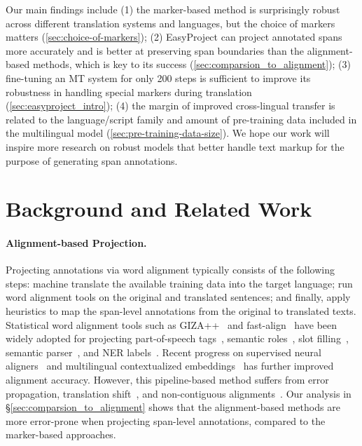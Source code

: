 \documentclass[11pt,dvipsnames]{article}
\begin{document}
Our main findings include (1) the marker-based method is surprisingly robust across different translation systems and languages, but the choice of markers matters (\ref{sec:choice-of-markers}); (2) EasyProject can project annotated spans more accurately and is better at preserving span boundaries than the  alignment-based methods, which is key to its success (\ref{sec:comparsion_to_alignment}); (3)  fine-tuning an MT system for only 200 steps is sufficient  to improve its robustness in handling special markers during translation (\ref{sec:easyproject_intro}); (4) the margin of improved cross-lingual transfer is related to the language/script family and amount of pre-training data included in the multilingual model (\ref{sec:pre-training-data-size}). 
We hope our work will inspire more research on robust models that better handle text markup for the purpose of generating span annotations.










\section{Background and Related Work}

\paragraph{Alignment-based Projection.}  Projecting annotations via word alignment typically consists of the following steps: machine translate the available training data into the target language; run word alignment tools on the original and translated sentences; and finally, apply heuristics to map the span-level annotations from the original to translated texts. 
Statistical word alignment tools such as  GIZA++~\citep{giza} and fast-align~\citep{dyer2013fast}  have been widely adopted for projecting part-of-speech tags~\citep{yarowsky-etal-2001-inducing,eskander2020unsupervised}, semantic roles~\citep{akbik-etal-2015-srl,aminian-etal-2017-transferring,daza2020xsrl,fei2020srl}, slot filling~\citep{xu2020end}, semantic parser~\citep{moradshahi-etal-2020-localizing,nicosia-etal-2021-translate-fill}, and NER labels~\citep{ni-etal-2017-weakly,stengel-eskin-etal-2019-discriminative}.
Recent progress on supervised neural aligners~\citep{jalili-sabet-etal-2020-simalign,nagata2020supervised,dou2021awesome,lan2021crfalign} and multilingual contextualized embeddings~\citep{devlin2019mbert,conneau2019xlmr} has further improved alignment accuracy.
However, this pipeline-based method suffers from error propagation, translation shift~\citep{akbik-etal-2015-srl}, and    non-contiguous alignments~\citep{zenkel-etal-2020-end}.
Our analysis in \S \ref{sec:comparsion_to_alignment} shows that the  alignment-based methods are  more error-prone when projecting span-level annotations, compared to the marker-based approaches.
\end{document}
